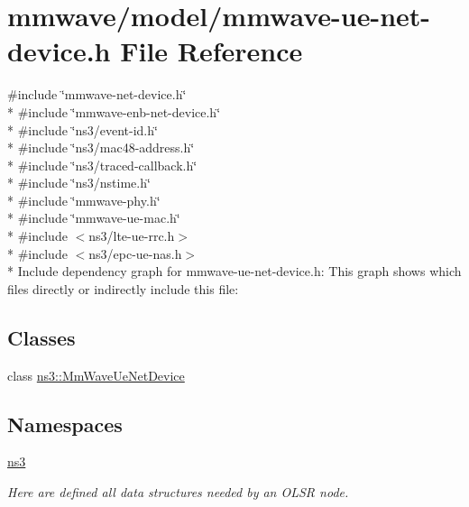 \hypertarget{mmwave-ue-net-device_8h}{}\section{mmwave/model/mmwave-\/ue-\/net-\/device.h File Reference}
\label{mmwave-ue-net-device_8h}
{\ttfamily \#include \char`\"{}mmwave-\/net-\/device.\+h\char`\"{}}\\*
{\ttfamily \#include \char`\"{}mmwave-\/enb-\/net-\/device.\+h\char`\"{}}\\*
{\ttfamily \#include \char`\"{}ns3/event-\/id.\+h\char`\"{}}\\*
{\ttfamily \#include \char`\"{}ns3/mac48-\/address.\+h\char`\"{}}\\*
{\ttfamily \#include \char`\"{}ns3/traced-\/callback.\+h\char`\"{}}\\*
{\ttfamily \#include \char`\"{}ns3/nstime.\+h\char`\"{}}\\*
{\ttfamily \#include \char`\"{}mmwave-\/phy.\+h\char`\"{}}\\*
{\ttfamily \#include \char`\"{}mmwave-\/ue-\/mac.\+h\char`\"{}}\\*
{\ttfamily \#include $<$ns3/lte-\/ue-\/rrc.\+h$>$}\\*
{\ttfamily \#include $<$ns3/epc-\/ue-\/nas.\+h$>$}\\*
Include dependency graph for mmwave-\/ue-\/net-\/device.h\+:
This graph shows which files directly or indirectly include this file\+:
\subsection*{Classes}
\begin{DoxyCompactItemize}
\item 
class \hyperlink{classns3_1_1MmWaveUeNetDevice}{ns3\+::\+Mm\+Wave\+Ue\+Net\+Device}
\end{DoxyCompactItemize}
\subsection*{Namespaces}
\begin{DoxyCompactItemize}
\item 
 \hyperlink{namespacens3}{ns3}
\begin{DoxyCompactList}\small\item\em Here are defined all data structures needed by an O\+L\+SR node. \end{DoxyCompactList}\end{DoxyCompactItemize}
